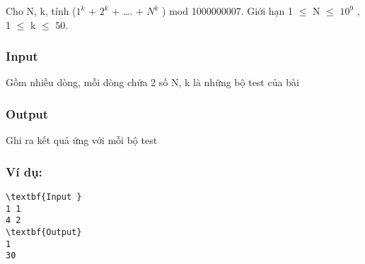 

Cho N, k, tính ($1^{k}$ + $2^{k}$ + …. + $N^{k}$ ) mod 1000000007. Giới hạn 1  $\le$  N  $\le$  $10^{9}$ , 1  $\le$  k  $\le$  50.

\subsubsection{Input}

Gồm nhiều dòng, mỗi dòng chứa 2 số N, k là những bộ test của bài

\subsubsection{Output}

Ghi ra kết quả ứng với mỗi bộ test

\subsubsection{Ví dụ:}
\begin{verbatim}
\textbf{Input }
1 1
4 2
\textbf{Output}
1
30


\end{verbatim}

